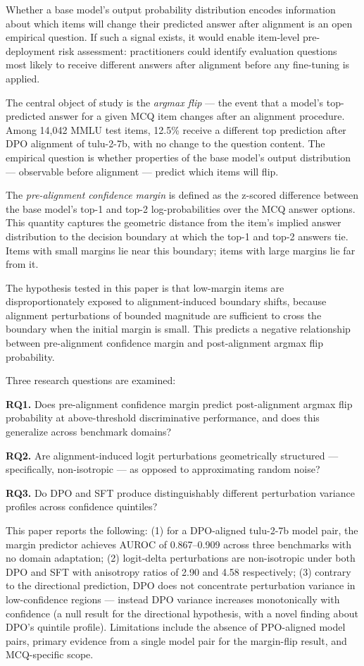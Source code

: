 
Whether a base model's output probability distribution encodes information about which items will change their predicted answer after alignment is an open empirical question. If such a signal exists, it would enable item-level pre-deployment risk assessment: practitioners could identify evaluation questions most likely to receive different answers after alignment before any fine-tuning is applied.

The central object of study is the \textit{argmax flip} --- the event that a model's top-predicted answer for a given MCQ item changes after an alignment procedure. Among 14,042 MMLU test items, 12.5\% receive a different top prediction after DPO alignment of tulu-2-7b, with no change to the question content. The empirical question is whether properties of the base model's output distribution --- observable before alignment --- predict which items will flip.

The \textit{pre-alignment confidence margin} is defined as the z-scored difference between the base model's top-1 and top-2 log-probabilities over the MCQ answer options. This quantity captures the geometric distance from the item's implied answer distribution to the decision boundary at which the top-1 and top-2 answers tie. Items with small margins lie near this boundary; items with large margins lie far from it.

The hypothesis tested in this paper is that low-margin items are disproportionately exposed to alignment-induced boundary shifts, because alignment perturbations of bounded magnitude are sufficient to cross the boundary when the initial margin is small. This predicts a negative relationship between pre-alignment confidence margin and post-alignment argmax flip probability.

Three research questions are examined:

\textbf{RQ1.} Does pre-alignment confidence margin predict post-alignment argmax flip probability at above-threshold discriminative performance, and does this generalize across benchmark domains?

\textbf{RQ2.} Are alignment-induced logit perturbations geometrically structured --- specifically, non-isotropic --- as opposed to approximating random noise?

\textbf{RQ3.} Do DPO and SFT produce distinguishably different perturbation variance profiles across confidence quintiles?

This paper reports the following: (1) for a DPO-aligned tulu-2-7b model pair, the margin predictor achieves AUROC of 0.867--0.909 across three benchmarks with no domain adaptation; (2) logit-delta perturbations are non-isotropic under both DPO and SFT with anisotropy ratios of 2.90 and 4.58 respectively; (3) contrary to the directional prediction, DPO does not concentrate perturbation variance in low-confidence regions --- instead DPO variance increases monotonically with confidence (a null result for the directional hypothesis, with a novel finding about DPO's quintile profile). Limitations include the absence of PPO-aligned model pairs, primary evidence from a single model pair for the margin-flip result, and MCQ-specific scope.

